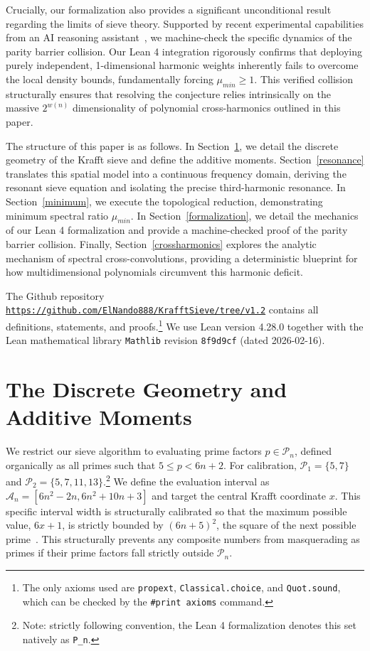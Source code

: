 \documentclass[lean]{AFM}
\renewcommand{\.}{\hskip .75pt}
\newcommand{\sekt}[1]{Section~\ref{#1}}
\begin{document}
Crucially, our formalization also provides a significant unconditional result regarding the limits of
sieve theory. Supported by recent experimental capabilities from an AI reasoning
assistant~\cite{geminiteam2025,Achim2025}, we machine-check the specific dynamics of the parity
barrier collision. Our Lean 4 integration rigorously confirms that deploying purely independent,
1-dimensional harmonic weights inherently fails to overcome the local density bounds, fundamentally
forcing $\mu_{min} \ge 1$. This verified collision structurally ensures that resolving the
conjecture relies intrinsically on the massive $2^{w(n)}$ dimensionality of polynomial
cross-harmonics outlined in this paper.

The structure of this paper is as follows. In \sekt{geometry}, we detail the discrete geometry of
the Krafft sieve and define the additive moments. \sekt{resonance} translates this spatial model
into a continuous frequency domain, deriving the resonant sieve equation and isolating the precise
third-harmonic resonance. In \sekt{minimum}, we execute the topological reduction, demonstrating
minimum spectral ratio $\mu_{min}$. In \sekt{formalization}, we detail the mechanics of our
Lean 4 formalization and provide a machine-checked proof of the parity barrier collision. Finally,
\sekt{crossharmonics} explores the analytic mechanism of spectral cross-convolutions, providing a
deterministic blueprint for how multidimensional polynomials circumvent this harmonic deficit.

The Github repository \href{https://github.com/ElNando888/KrafftSieve/tree/v1.2}
{\texttt{https://github.com/ElNando888/KrafftSieve/tree/v1.2}}
contains all definitions, statements, and proofs.\footnote{The only axioms used are
\texttt{propext}, \texttt{Classical.choice}, and \texttt{Quot.sound}, which can be checked by
the \texttt{\#print axioms} command.} We use Lean version 4.28.0 together with the Lean
mathematical library \texttt{Mathlib} \cite{Mathlib} revision \texttt{8f9d9cf} (dated 2026-02-16).

\section{The Discrete Geometry and Additive Moments} \label{geometry}

We restrict our sieve algorithm to evaluating prime factors $p \in \mathcal{P}_n$, defined organically as
all primes such that $5 \le p < 6n+2$. For calibration, $\mathcal{P}_1 = \{5, 7\}$ and
$\mathcal{P}_2 = \{5, 7, 11, 13\}$.\footnote{Note: strictly following convention, the Lean 4 formalization
denotes this set natively as \texttt{P\_n}.} We define the evaluation interval as
$\mathcal{A}_n = [6n^2 - 2n, 6n^2 + 10n + 3]$ and target the central Krafft coordinate $x$. This specific
interval width is structurally calibrated so that the maximum possible value, $6x+1$, is strictly
bounded by $(6n+5)^2$, the square of the next possible prime~\cite{Portela2026}. This structurally
prevents any composite numbers from masquerading as primes if their prime factors fall strictly
outside $\mathcal{P}_n$.
\end{document}

